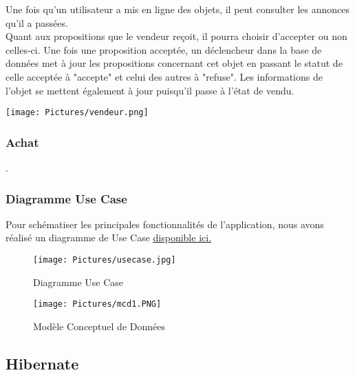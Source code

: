 \documentclass[12pt]{report}
\begin{document}
Une fois qu'un utilisateur a mis en ligne des objets, il peut consulter les annonces qu'il a passées. \\

Quant aux propositions que le vendeur reçoit, il pourra choisir d'accepter ou non celles-ci. Une fois une proposition acceptée, un déclencheur dans la base de données met à jour les propositions concernant cet objet en passant le statut de celle acceptée à "accepte" et celui des autres à "refuse". Les informations de l'objet se mettent également à jour puisqu'il passe à l'état de vendu.

\begin{center}
		\texttt{[image: Pictures/vendeur.png]}
\end{center}

\subsubsection*{Achat}  
.

\subsubsection*{Diagramme Use Case}
Pour schématiser les principales fonctionnalités de l'application, nous avons réalisé un diagramme de Use Case \hyperref[UseCase]{\underline{disponible ici}.}

\begin{figure}[htbp]
		\centering
			\texttt{[image: Pictures/usecase.jpg]}
			\caption{\label{UseCase}Diagramme Use Case}
			
	\end{figure}




\begin{landscape}
	\begin{figure}[htbp]
		\centering
			\texttt{[image: Pictures/mcd1.PNG]}
			\caption{\label{MCD}Modèle Conceptuel de Données}
			
	\end{figure}
\end{landscape}

\newpage
\subsection{\label{hibernate}Hibernate}
\end{document}
